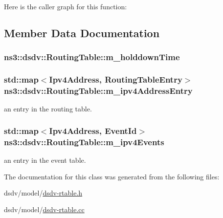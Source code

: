 Here is the caller graph for this function\+:




\subsection{Member Data Documentation}
\subsubsection[{\texorpdfstring{m\+\_\+holddown\+Time}{m_holddownTime}}]{ ns3\+::dsdv\+::\+Routing\+Table\+::m\+\_\+holddown\+Time\hspace{0.3cm}{\ttfamily [private]}}\hypertarget{classns3_1_1dsdv_1_1RoutingTable_a14506862d80e39a9bb5f899fd56e316b}{}\label{classns3_1_1dsdv_1_1RoutingTable_a14506862d80e39a9bb5f899fd56e316b}
\subsubsection[{\texorpdfstring{m\+\_\+ipv4\+Address\+Entry}{m_ipv4AddressEntry}}]{\setlength{\rightskip}{0pt plus 5cm}std\+::map$<${\bf Ipv4\+Address}, {\bf Routing\+Table\+Entry}$>$ ns3\+::dsdv\+::\+Routing\+Table\+::m\+\_\+ipv4\+Address\+Entry\hspace{0.3cm}{\ttfamily [private]}}\hypertarget{classns3_1_1dsdv_1_1RoutingTable_a75a9563681885f40224a78d95d05ad2c}{}\label{classns3_1_1dsdv_1_1RoutingTable_a75a9563681885f40224a78d95d05ad2c}


an entry in the routing table. 

\subsubsection[{\texorpdfstring{m\+\_\+ipv4\+Events}{m_ipv4Events}}]{\setlength{\rightskip}{0pt plus 5cm}std\+::map$<${\bf Ipv4\+Address}, {\bf Event\+Id}$>$ ns3\+::dsdv\+::\+Routing\+Table\+::m\+\_\+ipv4\+Events\hspace{0.3cm}{\ttfamily [private]}}\hypertarget{classns3_1_1dsdv_1_1RoutingTable_abddaab14aaa2f487321b871323399ee4}{}\label{classns3_1_1dsdv_1_1RoutingTable_abddaab14aaa2f487321b871323399ee4}


an entry in the event table. 



The documentation for this class was generated from the following files\+:\begin{DoxyCompactItemize}
\item 
dsdv/model/\hyperlink{dsdv-rtable_8h}{dsdv-\/rtable.\+h}\item 
dsdv/model/\hyperlink{dsdv-rtable_8cc}{dsdv-\/rtable.\+cc}\end{DoxyCompactItemize}

